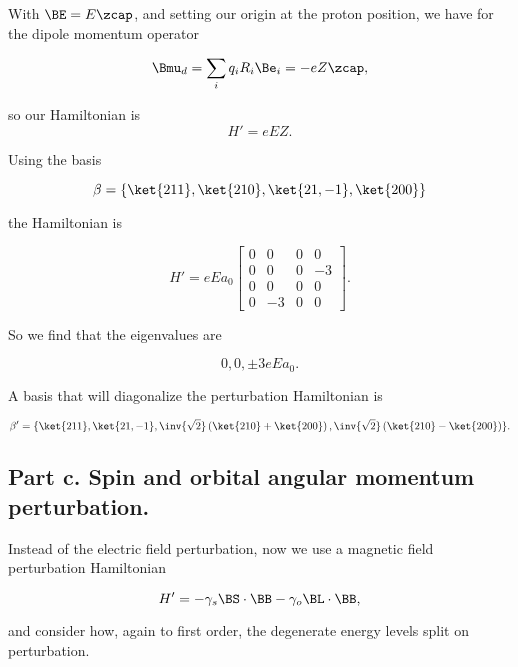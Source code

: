 With $\BE = E \zcap$, and setting our origin at the proton position, we have for the dipole momentum operator

\begin{equation}\label{eqn:qmTwoExamReflection:590}
\Bmu_d = \sum_i q_i R_i \Be_i = - e Z \zcap,
\end{equation}

so our Hamiltonian is
\begin{equation}\label{eqn:qmTwoExamReflection:610}
H' = e E Z.
\end{equation}

Using the basis

\begin{equation}\label{eqn:qmTwoExamReflection:630}
\beta = \{ 
\ket{211}, \ket{210}, \ket{21,-1}, \ket{200}
\}
\end{equation}

the Hamiltonian is

\begin{equation}\label{eqn:qmTwoExamReflection:650}
H' = 
e E a_0
\begin{bmatrix}
 0 & 0 & 0 & 0 \\
 0 & 0 & 0 & -3 \\
 0 & 0 & 0 & 0 \\
 0 & -3 & 0 & 0 
\end{bmatrix}.
\end{equation}

So we find that the eigenvalues are

\begin{equation}\label{eqn:qmTwoExamReflection:670}
0, 0, \pm 3 e E a_0.
\end{equation}

A basis that will diagonalize the perturbation Hamiltonian is

\begin{equation}\label{eqn:qmTwoExamReflection:690}
\beta' = \{ 
\ket{211}, \ket{21,-1},
\inv{\sqrt{2}} 
\left(\ket{210}
+\ket{200}
\right),
\inv{\sqrt{2}} 
\left(\ket{210}
-\ket{200}
\right)
\}.
\end{equation}


\subsection{Part c.  Spin and orbital angular momentum perturbation.}

Instead of the electric field perturbation, now we use a magnetic field perturbation Hamiltonian

\begin{equation}\label{eqn:qmTwoExamReflection:710}
H' = 
-\gamma_s \BS \cdot \BB 
-\gamma_o \BL \cdot \BB,
\end{equation}

and consider how, again to first order, the degenerate energy levels split on perturbation.

\EndArticle
